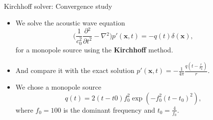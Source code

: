 \documentclass[10pt, aspectratio=169]{beamer}
\begin{document}
\begin{frame}{Kirchhoff solver: Convergence study}
	\begin{itemize}
		\item We solve the acoustic wave equation
		\begin{equation}
			\Bigg( \frac{1}{c_{0}^2}\frac{\partial{}^{2}}{\partial{t}^{2}}- \nabla{}^{2} \Bigg) p'(\mathbf{x}, t)  = -q(t)\delta(\mathbf{x}), 
		\end{equation}
		for a monopole source using the \textbf{Kirchhoff} method.
		\item And compare it with the exact solution $p'(\mathbf{x}, t) = -\frac{1}{4\pi} \frac{  q(t - \frac{r}{c_{0}}) }{r}$.
		\item We chose a monopole source
		\begin{equation}
			q(t) = 2(t - t0)f_{0}^{2}\exp( -f_{0}^2(t - t_{0})^{2}), 
		\end{equation}
		where $f_{0} = 100$ is the dominant frequency and $t_{0} = \frac{4}{f_{0}}$.
	\end{itemize}
\end{frame}
\end{document}
